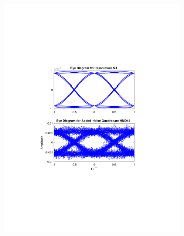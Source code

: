 \begin{refsection}
\begin{figure}[H]
\begin{minipage}{\linewidth}
\begin{subfigure}{.45\textwidth}
	\end{subfigure}
	\begin{subfigure}{.45\textwidth}
		\centering
		\includegraphics[clip, trim=5cm 7cm 5cm 7cm, width=\textwidth]{./sdf/m_qam_system/figures/eyes/q_n_nmf_45_60_rc_09.pdf}
	\end{subfigure}
	

\end{minipage}
\end{figure}
\end{refsection}
